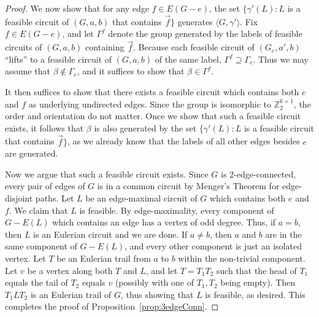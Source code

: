 \documentclass[10pt,a4paper]{amsart}
\begin{document}
\begin{proof}
    We now show that for any edge $f \in E(G - e)$, the set $\{\gamma'(L) : L$ is a feasible circuit of $(G,a,b)$ that contains $\vec{f}\}$ generates $\langle G,\gamma'\rangle$. Fix $f \in E(G - e)$, and let $\Gamma^f$ denote the group generated by the labels of feasible circuits of $(G,a,b)$ containing $\vec{f}$. Because each feasible circuit of $(G_e, a', b)$ ``lifts'' to a feasible circuit of $(G, a, b)$ of the same label, $\Gamma^f \supseteq \Gamma_e$. Thus we may assume that $\beta \not\in \Gamma_e$, and it suffices to show that $\beta \in \Gamma^f$.

    It then suffices to show that there exists a feasible circuit which contains both $e$ and $f$ as underlying undirected edges. Since the group is isomorphic to $\mathbb{Z}_2^{k+1}$, the order and orientation do not matter. Once we show that such a feasible circuit exists, it follows that $\beta$ is also generated by the set $\{\gamma'(L): L$ is a feasible circuit that contains $\vec{f}\}$, as we already know that the labels of all other edges besides $e$ are generated.
    
    Now we argue that such a feasible circuit exists. Since $G$ is $2$-edge-connected, every pair of edges of $G$ is in a common circuit by Menger's Theorem for edge-disjoint paths. Let $L$ be an edge-maximal circuit of $G$ which contains both $e$ and $f$. We claim that $L$ is feasible. By edge-maximality, every component of $G-E(L)$ which contains an edge has a vertex of odd degree. Thus, if $a=b$, then $L$ is an Eulerian circuit and we are done. If $a \neq b$, then $a$ and $b$ are in the same component of $G-E(L)$, and every other component is just an isolated vertex. Let $T$ be an Eulerian trail from $a$ to $b$ within the non-trivial component. Let $v$ be a vertex along both $T$ and $L$, and let $T = T_1T_2$ such that the head of $T_1$ equals the tail of $T_2$ equals $v$ (possibly with one of $T_1,T_2$ being empty). Then $T_1LT_2$ is an Eulerian trail of $G$, thus showing that $L$ is feasible, as desired. This completes the proof of Proposition~\ref{prop:3edgeConn}.
\end{proof}
\end{document}
